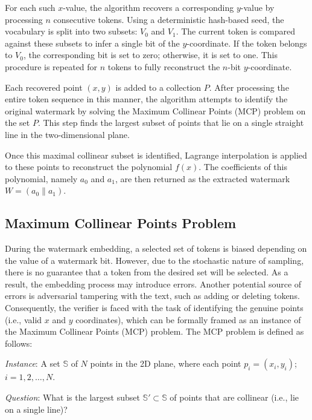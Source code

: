 \documentclass[a4paper,11pt]{llncs}
\begin{document}
For each such $x$-value, the algorithm recovers a corresponding $y$-value by processing $n$ consecutive tokens. Using a deterministic hash-based seed, the vocabulary is split into two subsets: $V_0$ and $V_1$. The current token is compared against these subsets to infer a single bit of the $y$-coordinate. If the token belongs to $V_0$, the corresponding bit is set to zero; otherwise, it is set to one. This procedure is repeated for $n$ tokens to fully reconstruct the $n$-bit $y$-coordinate.

Each recovered point $(x, y)$ is added to a collection $P$. After processing the entire token sequence in this manner, the algorithm attempts to identify the original watermark by solving the Maximum Collinear Points (MCP) problem on the set $P$. This step finds the largest subset of points that lie on a single straight line in the two-dimensional plane.

Once this maximal collinear subset is identified, Lagrange interpolation is applied to these points to reconstruct the polynomial $f(x)$. The coefficients of this polynomial, namely $a_0$ and $a_1$, are then returned as the extracted watermark $W = (a_0 \| a_1)$.


\subsection{Maximum Collinear Points Problem}

During the watermark embedding, a selected set of tokens is biased depending on the value of a watermark bit. However, due to the stochastic nature of sampling, there is no guarantee that a token from the desired set will be selected. As a result, the embedding process may introduce errors. Another potential source of errors is adversarial tampering with the text, such as adding or deleting tokens. Consequently, the verifier is faced with the task of identifying the genuine points (i.e., valid $x$ and $y$ coordinates), which can be formally framed as an instance of the Maximum Collinear Points (MCP) problem. The MCP problem is defined as follows:

\noindent
{\it Instance}: A set $\mathbb S$ of $N$ points in the 2D plane, where each point
$p_i=(x_i,y_i)$; $i=1,2,\ldots,N$.

\noindent
{\it Question}: What is the largest subset ${\mathbb S}' \subset {\mathbb S}$ of points that
are collinear (i.e., lie on a single line)?
\end{document}
